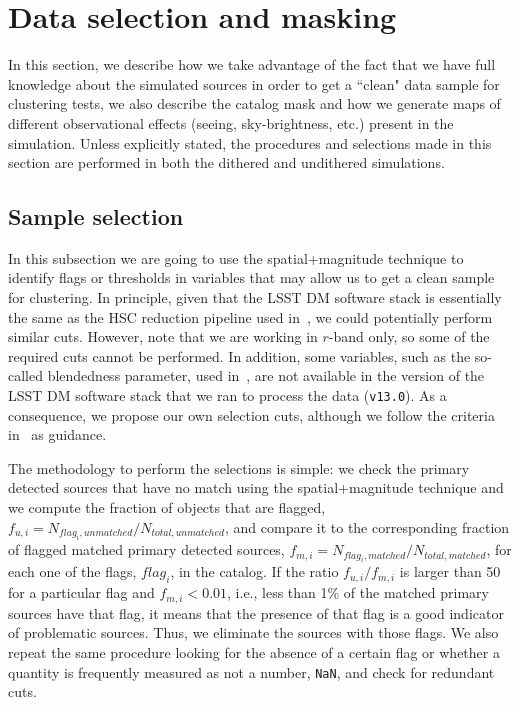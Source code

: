 \documentclass[\docopts]{\docclass}
\begin{document}
\section{Data selection and masking}
\label{sec:data_selection}
In this section, we describe how we take advantage of the fact that we have full knowledge about the simulated sources in order to get a ``clean" data sample for clustering tests, we also describe the catalog mask and how we generate maps of different observational effects (seeing, sky-brightness, etc.) present in the simulation. Unless explicitly stated, the procedures and selections made in this section are performed in both the dithered and undithered simulations.

\subsection{Sample selection}
\label{ssec:sample_selection}

In this subsection we are going to use the spatial+magnitude technique to identify flags or thresholds in variables that may allow us to get a clean sample for clustering. In principle, given that the LSST DM software stack is essentially the same as the HSC reduction pipeline used in~\citet{2018PASJ...70S..25M}, we could potentially perform similar cuts. However, note that we are working in $r$-band only, so some of the required cuts cannot be performed. In addition, some variables, such as the so-called blendedness parameter, used in~\citet{2018PASJ...70S..25M}, are not available in the version of the LSST DM software stack that we ran to process the data (\texttt{v13.0}). As a consequence, we propose our own selection cuts, although we follow the criteria in~\citet{2018PASJ...70S..25M} as guidance.


The methodology to perform the selections is simple: we check the primary detected sources that have no match using the spatial+magnitude technique and we compute the fraction of objects that are flagged, $f_{u,i} = N_{flag_{i}, unmatched}/N_{total, unmatched}$, and compare it to the corresponding fraction of flagged matched primary detected sources, $f_{m,i} = N_{flag_{i}, matched}/N_{total, matched}$, for each one of the flags, $flag_{i}$, in the catalog. If the ratio $f_{u,i}/f_{m,i}$ is larger than 50 for a particular flag and $f_{m,i} < 0.01$, i.e., less than 1\% of the matched primary sources have that flag, it means that the presence of that flag is a good indicator of problematic sources. Thus, we eliminate the sources with those flags. We also repeat the same procedure looking for the absence of a certain flag or whether a quantity is frequently measured as not a number, \texttt{NaN}, and check for redundant cuts. 
\end{document}
